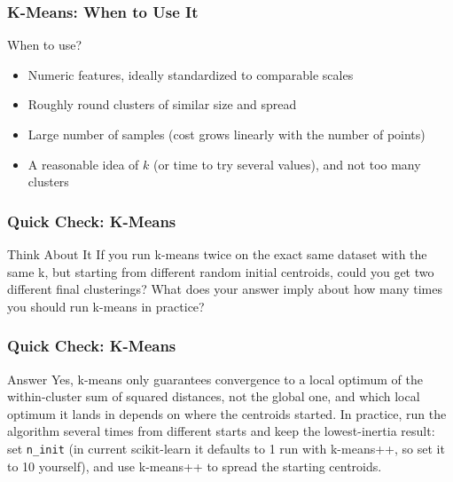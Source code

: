 \begin{frame}[fragile]\frametitle{K-Means: When to Use It}
When to use?
\begin{itemize}
\item  Numeric features, ideally standardized to comparable scales
\item  Roughly round clusters of similar size and spread
\item  Large number of samples (cost grows linearly with the number of points)
\item  A reasonable idea of $k$ (or time to try several values), and not too many clusters
\end{itemize}
\end{frame}



\begin{frame}[fragile]\frametitle{Quick Check: K-Means}
\begin{block}{Think About It}
If you run k-means twice on the exact same dataset with the same k, but starting from
different random initial centroids, could you get two different final clusterings? What
does your answer imply about how many times you should run k-means in practice?
\end{block}
\end{frame}

\begin{frame}[fragile]\frametitle{Quick Check: K-Means}
\begin{block}{Answer}
Yes, k-means only guarantees convergence to a local optimum of the within-cluster
sum of squared distances, not the global one, and which local optimum it lands in depends on where the
centroids started. In practice, run the algorithm several times from different starts and keep
the lowest-inertia result: set \texttt{n\_init} (in current scikit-learn it defaults to 1 run
with k-means++, so set it to 10 yourself), and use k-means++ to spread the starting centroids.
\end{block}
\end{frame}



